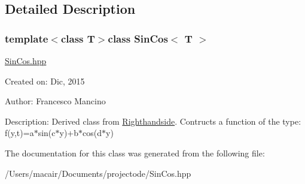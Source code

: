 \subsection{Detailed Description}
\subsubsection*{template$<$class T$>$class Sin\+Cos$<$ T $>$}

\hyperlink{_sin_cos_8hpp_source}{Sin\+Cos.\+hpp}

Created on\+: Dic, 2015 \begin{DoxyVerb}Author: Francesco Mancino
\end{DoxyVerb}


Description\+: Derived class from \hyperlink{class_righthandside}{Righthandside}. Contructs a function of the type\+: f(y,t)=a$\ast$sin(c$\ast$y)+b$\ast$cos(d$\ast$y) 

The documentation for this class was generated from the following file\+:\begin{DoxyCompactItemize}
\item 
/\+Users/macair/\+Documents/projectode/Sin\+Cos.\+hpp\end{DoxyCompactItemize}
